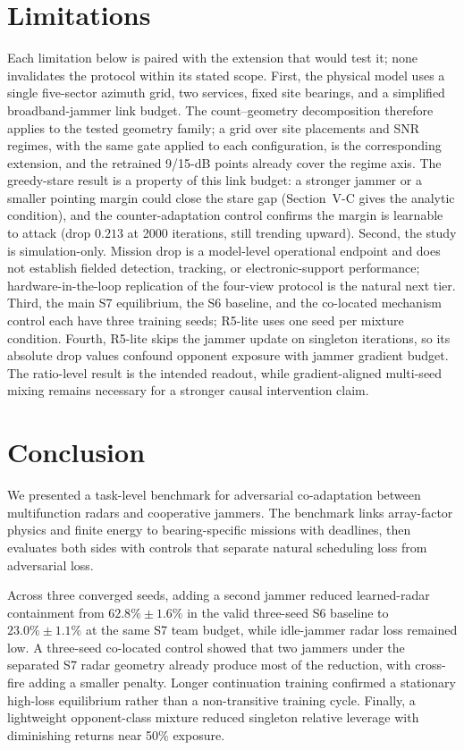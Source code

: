 \section{Limitations}
Each limitation below is paired with the extension that would test it; none invalidates the protocol within its stated scope. First, the physical model uses a single five-sector azimuth grid, two services, fixed site bearings, and a simplified broadband-jammer link budget. The count--geometry decomposition therefore applies to the tested geometry family; a grid over site placements and SNR regimes, with the same gate applied to each configuration, is the corresponding extension, and the retrained 9/15-dB points already cover the regime axis. The greedy-stare result is a property of this link budget: a stronger jammer or a smaller pointing margin could close the stare gap (Section~V-C gives the analytic condition), and the counter-adaptation control confirms the margin is learnable to attack (drop $0.213$ at 2000 iterations, still trending upward). Second, the study is simulation-only. Mission drop is a model-level operational endpoint and does not establish fielded detection, tracking, or electronic-support performance; hardware-in-the-loop replication of the four-view protocol is the natural next tier. Third, the main S7 equilibrium, the S6 baseline, and the co-located mechanism control each have three training seeds; R5-lite uses one seed per mixture condition. Fourth, R5-lite skips the jammer update on singleton iterations, so its absolute drop values confound opponent exposure with jammer gradient budget. The ratio-level result is the intended readout, while gradient-aligned multi-seed mixing remains necessary for a stronger causal intervention claim.

\section{Conclusion}
We presented a task-level benchmark for adversarial co-adaptation between multifunction radars and cooperative jammers. The benchmark links array-factor physics and finite energy to bearing-specific missions with deadlines, then evaluates both sides with controls that separate natural scheduling loss from adversarial loss.

Across three converged seeds, adding a second jammer reduced learned-radar containment from $62.8\%\pm1.6\%$ in the valid three-seed S6 baseline to $23.0\%\pm1.1\%$ at the same S7 team budget, while idle-jammer radar loss remained low. A three-seed co-located control showed that two jammers under the separated S7 radar geometry already produce most of the reduction, with cross-fire adding a smaller penalty. Longer continuation training confirmed a stationary high-loss equilibrium rather than a non-transitive training cycle. Finally, a lightweight opponent-class mixture reduced singleton relative leverage with diminishing returns near 50\% exposure.

